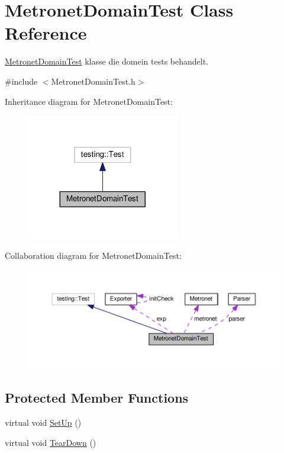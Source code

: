 \hypertarget{class_metronet_domain_test}{}\section{Metronet\+Domain\+Test Class Reference}
\label{class_metronet_domain_test}


\hyperlink{class_metronet_domain_test}{Metronet\+Domain\+Test} klasse die domein tests behandelt.  




{\ttfamily \#include $<$Metronet\+Domain\+Test.\+h$>$}



Inheritance diagram for Metronet\+Domain\+Test\+:
\nopagebreak
\begin{figure}[H]
\begin{center}
\leavevmode
\includegraphics[width=188pt]{class_metronet_domain_test__inherit__graph}
\end{center}
\end{figure}


Collaboration diagram for Metronet\+Domain\+Test\+:
\nopagebreak
\begin{figure}[H]
\begin{center}
\leavevmode
\includegraphics[width=350pt]{class_metronet_domain_test__coll__graph}
\end{center}
\end{figure}
\subsection*{Protected Member Functions}
\begin{DoxyCompactItemize}
\item 
virtual void \hyperlink{class_metronet_domain_test_ac8e8d15b45d53810c4427084fad6388f}{Set\+Up} ()
\item 
virtual void \hyperlink{class_metronet_domain_test_a3429b373771815652c80d013f81369a0}{Tear\+Down} ()
\end{DoxyCompactItemize}
